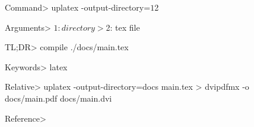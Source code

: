 Command> uplatex -output-directory=$1 $2

Arguments> $1: directory
         > $2: tex file

TL;DR> compile ./docs/main.tex

Keywords> latex

Relative> uplatex -output-directory=docs main.tex
        > dvipdfmx -o docs/main.pdf docs/main.dvi

Reference> 
